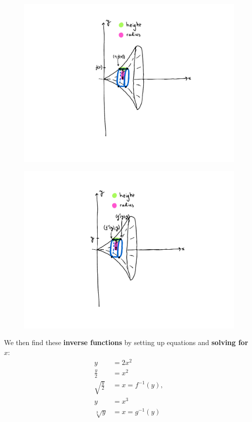 \documentclass[11pt,serif,aspectratio=169]{beamer}
\newcommand{\inverse}[1]{#1^{-1}}
\begin{document}
	
	\begin{frame}
		\begin{figure}
			\centering
			\includegraphics[height=0.9\paperheight]{x.pdf}	
		\end{figure}
	\end{frame}
	
	\begin{frame}
		\begin{figure}
			\centering
			\includegraphics[height=0.9\paperheight]{y.pdf}	
		\end{figure}
	\end{frame}
	
	\begin{frame}
		We then find these \textbf{inverse functions} by setting up equations and \textbf{solving for $x$}:
		\begin{align*}
			y &= 2x^2 \\
			\frac y2 &= x^2 \\
			\sqrt{\frac y2} &= x = \inverse f(y), \\[1.5em]
			y &= x^3 \\
			\sqrt[3]y &= x = \inverse g(y)
		\end{align*}
	\end{frame}
	
\end{document}
